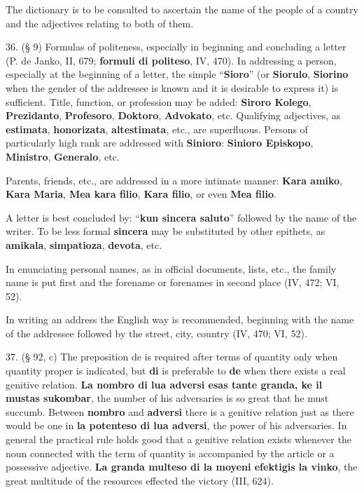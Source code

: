 The dictionary is to be consulted to ascertain the name of the people of a country and the adjectives relating to both of them.

36. (§ 9) Formulas of politeness, especially in beginning and concluding a letter (P. de Janko, II, 679; \textbf{formuli di politeso}, IV, 470). In addressing a person, especially at the beginning of a letter, the simple ``\textbf{Sioro}'' (or \textbf{Siorulo}, \textbf{Siorino} when the gender of the addressee is known and it is desirable to express it) is sufficient. Title, function, or profession may be added: \textbf{Siroro Kolego}, \textbf{Prezidanto}, \textbf{Profesoro}, \textbf{Doktoro}, \textbf{Advokato}, etc. Qualifying adjectives, as \textbf{estimata}, \textbf{honorizata}, \textbf{altestimata}, etc., are superfluous. Persons of particularly high rank are addressed with \textbf{Sinioro}: \textbf{Sinioro Episkopo}, \textbf{Ministro}, \textbf{Generalo}, etc. %

Parents, friends, etc., are addressed in a more intimate manner: \textbf{Kara amiko}, \textbf{Kara Maria}, \textbf{Mea kara filio}, \textbf{Kara filio}, or even \textbf{Mea filio}.

A letter is best concluded by: ``\textbf{kun sincera saluto}'' followed by the name of the writer. To be less formal \textbf{sincera} may be substituted by other epithets, as \textbf{amikala}, \textbf{simpatioza}, \textbf{devota}, etc.

In enunciating personal names, as in official documents, lists, etc., the family name is put first and the forename or forenames in second place (IV, 472; VI, 52).

In writing an address the English way is recommended, beginning with the name of the addressee followed by the street, city, country (IV, 470; VI, 52).

37. (§ 92, c) The preposition de is required after terms of quantity only when quantity proper is indicated, but \textbf{di} is preferable to \textbf{de} when there exists a real genitive relation. \textbf{La nombro di lua adversi esas tante granda, ke il mustas sukombar}, the number of his adversaries is so great that he must succumb. Between \textbf{nombro} and \textbf{adversi} there is a genitive relation just as there would be one in \textbf{la potenteso di lua adversi}, the power of his adversaries. In general the practical rule holds good that a genitive relation exists whenever the noun connected with the term of quantity is accompanied by the article or a possessive adjective. \textbf{La granda multeso di la moyeni efektigis la vinko}, the great multitude of the resources effected the victory (III, 624). %

